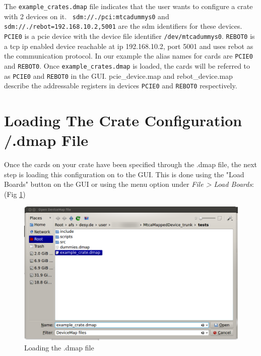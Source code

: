 The \texttt{example\_crates.dmap} file indicates that the user
wants to configure a crate with 2 devices on it.
~\texttt{sdm://./pci:mtcadummys0} and \\ \texttt{sdm://./rebot=192.168.10.2,5001}
are the sdm identifiers for these devices. \texttt{PCIE0} is a pcie device with the device 
file identifier \texttt{/dev/mtcadummys0}. \texttt{REBOT0} is a tcp ip enabled device reachable 
at ip 192.168.10.2, port 5001 and uses rebot as the communication protocol.
In our example the alias names for cards are \texttt{PCIE0} and \texttt{REBOT0}. Once \texttt{example\_crates.dmap} is loaded, the cards
will be referred to as \texttt{PCIE0} and \texttt{REBOT0} in the GUI.  pcie\_device.map and rebot\_device.map describe the addressable registers
in devices \texttt{PCIE0} and \texttt{REBOT0}  respectively.


\section{Loading The Crate Configuration /.dmap File} 

Once the cards on your
crate have been specified through the .dmap file, the next step is loading this
configuration on to the GUI. This is done using the "Load Boards" button on the
GUI or using the menu option under \textit{File > Load Boards}: 
(Fig \ref{load_boards_open_menu_to_load_dmap})
 
\begin{figure}[htbp] 
    \centering
    \includegraphics[width=.8\textwidth]{images/load_boards.png}
    \caption{Loading the .dmap file} \label{load_boards_open_menu_to_load_dmap}
\end{figure}

